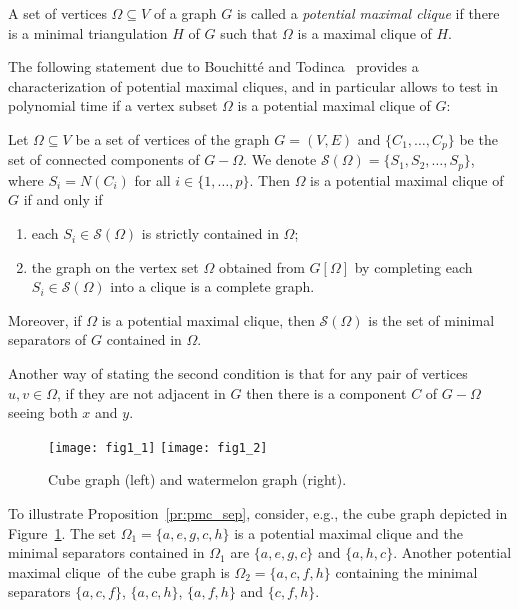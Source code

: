 \documentclass{llncs}
\newcommand{\pmc}{potential maximal clique}
\begin{document}
A set of vertices $\Omega \subseteq V$ of a graph $G$ is called a
{\em potential maximal clique} if there is a minimal triangulation
$H$ of $G$ such that $\Omega$ is a maximal clique of $H$. 



The following statement due to Bouchitt{\'e} and Todinca~\cite{BoTo01} provides a characterization of potential maximal cliques, and in particular allows to test in polynomial time if a vertex subset $\Omega$ is a potential maximal clique of $G$:


\begin{proposition}\label{pr:pmc_sep}
Let $\Omega \subseteq V$ be a set of vertices of the graph $G=(V,E)$ and
  $ \{ C_1, \ldots, C_p\}$ be the set of 
connected components of $G - \Omega$. We denote  ${\mathcal S}(\Omega) = \{
S_1,S_2, \ldots  , S_p\}$, where $S_i = N(C_i)$ for all $i \in \{1,\dots, p\}$. Then
$\Omega$ is a potential maximal clique of $G$ if and only if
\begin{enumerate}
\item each $S_i \in {\mathcal{S}}(\Omega)$ is strictly contained in $\Omega$;
\item the graph on the vertex set $\Omega$ obtained from $G[\Omega]$ by
completing each $S_i \in {\mathcal{S}}(\Omega)$ into a clique is a
complete graph.
\end{enumerate}
Moreover, if $\Omega$ is a potential maximal clique, then
$\mathcal S(\Omega)$ is  the set of minimal separators of $G$ contained
in $\Omega$.
\end{proposition}

Another way of stating the second condition is that for any pair of vertices $u,v \in \Omega$, if they are not adjacent in $G$ then 
there is a component $C$ of $G - \Omega$ seeing both $x$ and $y$. 

\begin{figure}[h]
\label{fi:cubewaterm}
\begin{center}
\texttt{[image: fig1\_1]}
\texttt{[image: fig1\_2]}
\end{center}
\caption{Cube graph (left) and watermelon graph (right).}
\end{figure}


To illustrate Proposition~\ref{pr:pmc_sep}, consider, e.g., the cube graph depicted in Figure~\ref{fi:cubewaterm}. The set $\Omega_1 = \{a,e,g,c,h\}$ is a potential maximal clique and the minimal separators contained in $\Omega_1$ are $\{a,e,g,c\}$ and $\{a,h,c\}$. Another \pmc\ of the cube graph is $\Omega_2 = \{a,c,f,h\}$ containing the minimal separators $\{a,c,f\}$, $\{a,c,h\}$, $\{a,f,h\}$ and $\{c,f,h\}$. 
 
\end{document}
